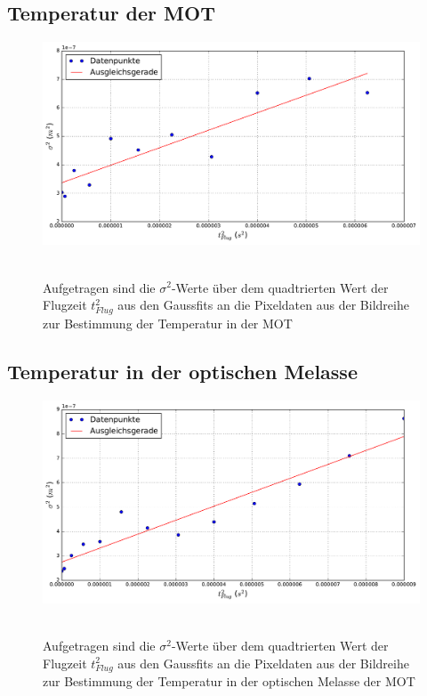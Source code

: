 \documentclass[twoside,colorback,accentcolor=tud4c,11pt]{tudreport}
\begin{document}
\subsection{Temperatur der MOT}
\begin{figure}[H]
\centering
   	\begin{minipage}[b]{0.85\textwidth}
   	\includegraphics[width=\textwidth]{graphics/tempmot.pdf}\
   	\end{minipage}
\caption{Aufgetragen sind die $\sigma^2$-Werte über dem quadtrierten Wert der Flugzeit $t_{Flug}^2$ aus den Gaussfits an die Pixeldaten aus der Bildreihe zur Bestimmung der Temperatur in der MOT}\label{tmot}	
\end{figure}
\subsection{Temperatur in der optischen Melasse}
\begin{figure}[H]
\centering
   	\begin{minipage}[b]{0.85\textwidth}
   	\includegraphics[width=\textwidth]{graphics/tempmel.pdf}\
   	\end{minipage}
\caption{Aufgetragen sind die $\sigma^2$-Werte über dem quadtrierten Wert der Flugzeit $t_{Flug}^2$ aus den Gaussfits an die Pixeldaten aus der Bildreihe zur Bestimmung der Temperatur in der optischen Melasse der MOT}\label{tmel}	
\end{figure}
\end{document}
